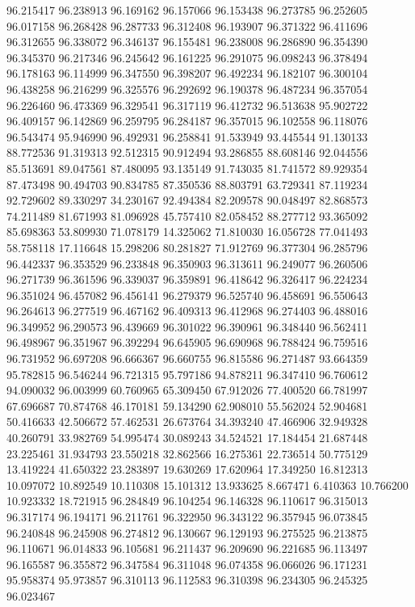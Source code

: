 96.215417
96.238913
96.169162
96.157066
96.153438
96.273785
96.252605
96.017158
96.268428
96.287733
96.312408
96.193907
96.371322
96.411696
96.312655
96.338072
96.346137
96.155481
96.238008
96.286890
96.354390
96.345370
96.217346
96.245642
96.161225
96.291075
96.098243
96.378494
96.178163
96.114999
96.347550
96.398207
96.492234
96.182107
96.300104
96.438258
96.216299
96.325576
96.292692
96.190378
96.487234
96.357054
96.226460
96.473369
96.329541
96.317119
96.412732
96.513638
95.902722
96.409157
96.142869
96.259795
96.284187
96.357015
96.102558
96.118076
96.543474
95.946990
96.492931
96.258841
91.533949
93.445544
91.130133
88.772536
91.319313
92.512315
90.912494
93.286855
88.608146
92.044556
85.513691
89.047561
87.480095
93.135149
91.743035
81.741572
89.929354
87.473498
90.494703
90.834785
87.350536
88.803791
63.729341
87.119234
92.729602
89.330297
34.230167
92.494384
82.209578
90.048497
82.868573
74.211489
81.671993
81.096928
45.757410
82.058452
88.277712
93.365092
85.698363
53.809930
71.078179
14.325062
71.810030
16.056728
77.041493
58.758118
17.116648
15.298206
80.281827
71.912769
96.377304
96.285796
96.442337
96.353529
96.233848
96.350903
96.313611
96.249077
96.260506
96.271739
96.361596
96.339037
96.359891
96.418642
96.326417
96.224234
96.351024
96.457082
96.456141
96.279379
96.525740
96.458691
96.550643
96.264613
96.277519
96.467162
96.409313
96.412968
96.274403
96.488016
96.349952
96.290573
96.439669
96.301022
96.390961
96.348440
96.562411
96.498967
96.351967
96.392294
96.645905
96.690968
96.788424
96.759516
96.731952
96.697208
96.666367
96.660755
96.815586
96.271487
93.664359
95.782815
96.546244
96.721315
95.797186
94.878211
96.347410
96.760612
94.090032
96.003999
60.760965
65.309450
67.912026
77.400520
66.781997
67.696687
70.874768
46.170181
59.134290
62.908010
55.562024
52.904681
50.416633
42.506672
57.462531
26.673764
34.393240
47.466906
32.949328
40.260791
33.982769
54.995474
30.089243
34.524521
17.184454
21.687448
23.225461
31.934793
23.550218
32.862566
16.275361
22.736514
50.775129
13.419224
41.650322
23.283897
19.630269
17.620964
17.349250
16.812313
10.097072
10.892549
10.110308
15.101312
13.933625
8.667471
6.410363
10.766200
10.923332
18.721915
96.284849
96.104254
96.146328
96.110617
96.315013
96.317174
96.194171
96.211761
96.322950
96.343122
96.357945
96.073845
96.240848
96.245908
96.274812
96.130667
96.129193
96.275525
96.213875
96.110671
96.014833
96.105681
96.211437
96.209690
96.221685
96.113497
96.165587
96.355872
96.347584
96.311048
96.074358
96.066026
96.171231
95.958374
95.973857
96.310113
96.112583
96.310398
96.234305
96.245325
96.023467

